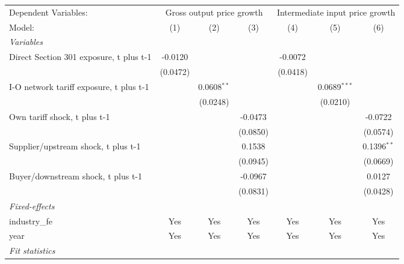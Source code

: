 \begingroup
\centering
\begin{tabular}{lcccccc}
   \tabularnewline \midrule \midrule
   Dependent Variables: & \multicolumn{3}{c}{Gross output price growth} & \multicolumn{3}{c}{Intermediate input price growth}\\
   Model:                                  & (1)      & (2)           & (3)      & (4)      & (5)            & (6)\\  
   \midrule
   \emph{Variables}\\
   Direct Section 301 exposure, t plus t-1 & -0.0120  &               &          & -0.0072  &                &   \\   
                                           & (0.0472) &               &          & (0.0418) &                &   \\   
   I-O network tariff exposure, t plus t-1 &          & 0.0608$^{**}$ &          &          & 0.0689$^{***}$ &   \\   
                                           &          & (0.0248)      &          &          & (0.0210)       &   \\   
   Own tariff shock, t plus t-1            &          &               & -0.0473  &          &                & -0.0722\\   
                                           &          &               & (0.0850) &          &                & (0.0574)\\   
   Supplier/upstream shock, t plus t-1     &          &               & 0.1538   &          &                & 0.1396$^{**}$\\   
                                           &          &               & (0.0945) &          &                & (0.0669)\\   
   Buyer/downstream shock, t plus t-1      &          &               & -0.0967  &          &                & 0.0127\\   
                                           &          &               & (0.0831) &          &                & (0.0428)\\   
   \midrule
   \emph{Fixed-effects}\\
   industry\_fe                            & Yes      & Yes           & Yes      & Yes      & Yes            & Yes\\  
   year                                    & Yes      & Yes           & Yes      & Yes      & Yes            & Yes\\  
   \midrule
   \emph{Fit statistics}\\

\end{tabular}
